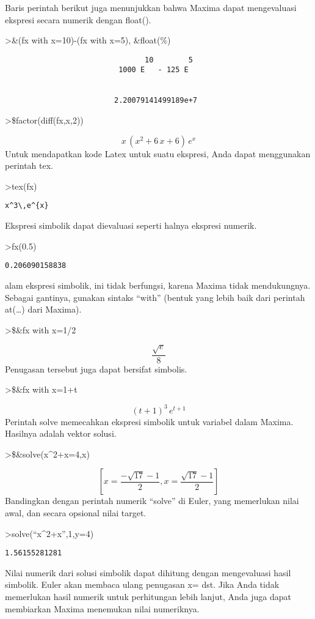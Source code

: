 \documentclass[
]{book}
\begin{document}
Baris perintah berikut juga menunjukkan bahwa Maxima dapat mengevaluasi ekspresi secara numerik dengan float().

\textgreater\&(fx with x=10)-(fx with x=5), \&float(\%)

\begin{verbatim}
                                10        5
                          1000 E   - 125 E


                         2.20079141499189e+7
\end{verbatim}

\textgreater\$factor(diff(fx,x,2))

\[x\,\left(x^2+6\,x+6\right)\,e^{x}\]Untuk mendapatkan kode Latex untuk suatu ekspresi, Anda dapat menggunakan perintah tex.

\textgreater tex(fx)

\begin{verbatim}
x^3\,e^{x}
\end{verbatim}

Ekspresi simbolik dapat dievaluasi seperti halnya ekspresi numerik.

\textgreater fx(0.5)

\begin{verbatim}
0.206090158838
\end{verbatim}

alam ekspresi simbolik, ini tidak berfungsi, karena Maxima tidak mendukungnya. Sebagai gantinya, gunakan sintaks ``with'' (bentuk yang lebih baik dari perintah at(\ldots) dari Maxima).

\textgreater\$\&fx with x=1/2

\[\frac{\sqrt{e}}{8}\]Penugasan tersebut juga dapat bersifat simbolis.

\textgreater\$\&fx with x=1+t

\[\left(t+1\right)^3\,e^{t+1}\]Perintah solve memecahkan ekspresi simbolik untuk variabel dalam Maxima. Hasilnya adalah vektor solusi.

\textgreater\$\&solve(x\^{}2+x=4,x)

\[\left[ x=\frac{-\sqrt{17}-1}{2} , x=\frac{\sqrt{17}-1}{2} \right] \]Bandingkan dengan perintah numerik ``solve'' di Euler, yang memerlukan nilai awal, dan secara opsional nilai target.

\textgreater solve(``x\^{}2+x'',1,y=4)

\begin{verbatim}
1.56155281281
\end{verbatim}

Nilai numerik dari solusi simbolik dapat dihitung dengan mengevaluasi hasil simbolik. Euler akan membaca ulang penugasan x= dst. Jika Anda tidak memerlukan hasil numerik untuk perhitungan lebih lanjut, Anda juga dapat membiarkan Maxima menemukan nilai numeriknya.
\end{document}
